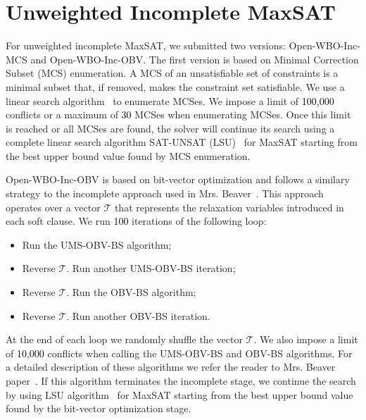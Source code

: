 \documentclass[conference]{IEEEtran}
\newcommand{\sjcomment}[1]{\textcolor{sjcolor}{SJ:#1}}
\newcommand{\toolname}{\textsf{Open-WBO-Inc}\xspace}
\newcommand{\mcs}{\textsf{Open-WBO-Inc-MCS}\xspace}
\newcommand{\obv}{\textsf{Open-WBO-Inc-OBV}\xspace}
\newcommand{\todo}[1]{\textcolor{black}{#1}}
\begin{document}

\section{Unweighted Incomplete MaxSAT}
For unweighted incomplete MaxSAT, we submitted two versions: \mcs and \obv. The first version is based on Minimal Correction Subset (MCS) enumeration. A MCS of an unsatisfiable set of constraints is a minimal subset that, if removed, makes the constraint set satisfiable. We use a linear search algorithm~\cite{bls} to enumerate MCSes. We impose a limit of \todo{100,000} conflicts or a maximum of \todo{30} MCSes when enumerating MCSes. Once this limit is reached or all MCSes are found, the solver will continue its search using a complete linear search algorithm SAT-UNSAT (LSU)~\cite{berre-jsat10} for MaxSAT starting from the best upper bound value found by MCS enumeration. 

\obv is based on bit-vector optimization and follows a similary strategy to the incomplete approach used in \textsf{Mrs. Beaver}~\cite{beaver}. This approach operates over a vector $\mathcal T$ that represents the relaxation variables introduced in each soft clause. We run \todo{100} iterations of the following loop:
\begin{itemize}
\item Run the \textsf{UMS-OBV-BS} algorithm;
\item Reverse $\mathcal T$. Run another \textsf{UMS-OBV-BS} iteration;
\item Reverse $\mathcal T$. Run the \textsf{OBV-BS} algorithm;
\item Reverse $\mathcal T$. Run another \textsf{OBV-BS} iteration.
\end{itemize}

At the end of each loop we randomly shuffle the vector $\mathcal T$. We also impose a limit of \todo{10,000} conflicts when calling the \textsf{UMS-OBV-BS} and \textsf{OBV-BS} algorithms. For a detailed description of these algorithms we refer the reader to \textsf{Mrs. Beaver} paper~\cite{beaver}. If this algorithm terminates the incomplete stage, we continue the search by using LSU algorithm~\cite{berre-jsat10} for MaxSAT starting from the best upper bound value found by the bit-vector optimization stage.
\end{document}
